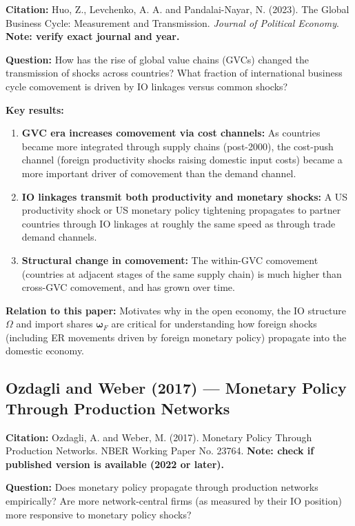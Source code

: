 \documentclass[12pt]{article}
\begin{document}
\textbf{Citation:} Huo, Z., Levchenko, A. A. and Pandalai-Nayar, N. (2023). The Global Business Cycle: Measurement and Transmission. \textit{Journal of Political Economy}. \textbf{Note: verify exact journal and year.}

\textbf{Question:} How has the rise of global value chains (GVCs) changed the transmission of shocks across countries? What fraction of international business cycle comovement is driven by IO linkages versus common shocks?

\textbf{Key results:}
\begin{enumerate}
    \item \textbf{GVC era increases comovement via cost channels:} As countries became more integrated through supply chains (post-2000), the cost-push channel (foreign productivity shocks raising domestic input costs) became a more important driver of comovement than the demand channel.
    \item \textbf{IO linkages transmit both productivity and monetary shocks:} A US productivity shock or US monetary policy tightening propagates to partner countries through IO linkages at roughly the same speed as through trade demand channels.
    \item \textbf{Structural change in comovement:} The within-GVC comovement (countries at adjacent stages of the same supply chain) is much higher than cross-GVC comovement, and has grown over time.
\end{enumerate}

\textbf{Relation to this paper:} Motivates why in the open economy, the IO structure $\Omega$ and import shares $\bm{\omega}_F$ are critical for understanding how foreign shocks (including ER movements driven by foreign monetary policy) propagate into the domestic economy.

\subsection{Ozdagli and Weber (2017) --- Monetary Policy Through Production Networks}

\textbf{Citation:} Ozdagli, A. and Weber, M. (2017). Monetary Policy Through Production Networks. NBER Working Paper No. 23764. \textbf{Note: check if published version is available (2022 or later).}

\textbf{Question:} Does monetary policy propagate through production networks empirically? Are more network-central firms (as measured by their IO position) more responsive to monetary policy shocks?
\end{document}
